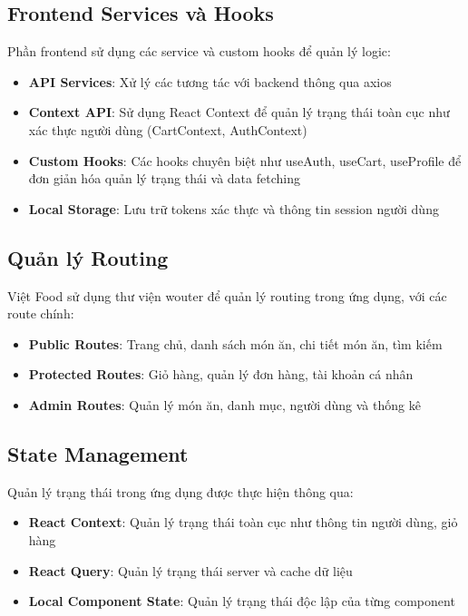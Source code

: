 \subsection{Frontend Services và Hooks}
Phần frontend sử dụng các service và custom hooks để quản lý logic:
\begin{itemize}
    \item \textbf{API Services}: Xử lý các tương tác với backend thông qua axios
    \item \textbf{Context API}: Sử dụng React Context để quản lý trạng thái toàn cục như xác thực người dùng (CartContext, AuthContext)
    \item \textbf{Custom Hooks}: Các hooks chuyên biệt như useAuth, useCart, useProfile để đơn giản hóa quản lý trạng thái và data fetching
    \item \textbf{Local Storage}: Lưu trữ tokens xác thực và thông tin session người dùng
\end{itemize}

\subsection{Quản lý Routing}
Việt Food sử dụng thư viện wouter để quản lý routing trong ứng dụng, với các route chính:
\begin{itemize}
    \item \textbf{Public Routes}: Trang chủ, danh sách món ăn, chi tiết món ăn, tìm kiếm
    \item \textbf{Protected Routes}: Giỏ hàng, quản lý đơn hàng, tài khoản cá nhân
    \item \textbf{Admin Routes}: Quản lý món ăn, danh mục, người dùng và thống kê
\end{itemize}

\subsection{State Management}
Quản lý trạng thái trong ứng dụng được thực hiện thông qua:
\begin{itemize}
    \item \textbf{React Context}: Quản lý trạng thái toàn cục như thông tin người dùng, giỏ hàng
    \item \textbf{React Query}: Quản lý trạng thái server và cache dữ liệu
    \item \textbf{Local Component State}: Quản lý trạng thái độc lập của từng component
\end{itemize}

